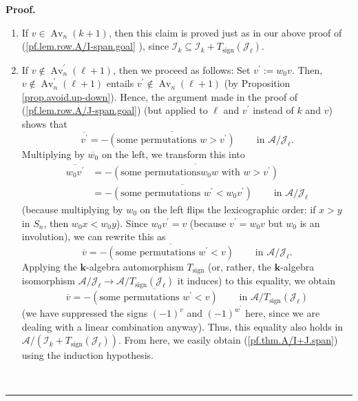 \documentclass[numbers=enddot,12pt,final,onecolumn,notitlepage]{scrartcl}%
\numberwithin{exer}{subsection}
\theoremstyle{definition}
\newenvironment{proof}[1][Proof]{\noindent\textbf{#1.} }{\ \rule{0.5em}{0.5em}}
\begin{document}
\begin{proof}
\begin{enumerate}
\item If $v\in\operatorname*{Av}\nolimits_{n}\left(  k+1\right)  $, then this
claim is proved just as in our above proof of (\ref{pf.lem.row.A/I-span.goal}%
), since $\mathcal{I}_{k}\subseteq\mathcal{I}_{k}+T_{\operatorname*{sign}%
}\left(  \mathcal{J}_{\ell}\right)  $.

\item If $v\notin\operatorname*{Av}\nolimits_{n}^{\prime}\left(
\ell+1\right)  $, then we proceed as follows: Set $v^{\prime}:=w_{0}v$. Then,
$v\notin\operatorname*{Av}\nolimits_{n}^{\prime}\left(  \ell+1\right)  $
entails $v^{\prime}\notin\operatorname*{Av}\nolimits_{n}\left(  \ell+1\right)
$ (by Proposition \ref{prop.avoid.up-down}). Hence, the argument made in the
proof of (\ref{pf.lem.row.A/J-span.goal}) (but applied to $\ell$ and
$v^{\prime}$ instead of $k$ and $v$) shows that
\[
\overline{v^{\prime}}=-\overline{\left(  \text{some permutations }w>v^{\prime
}\right)  }\ \ \ \ \ \ \ \ \ \ \text{in }\mathcal{A}/\mathcal{J}_{\ell}.
\]
Multiplying by $\overline{w_{0}}$ on the left, we transform this into
\begin{align*}
\overline{w_{0}v^{\prime}}  &  =-\overline{\left(  \text{some permutations
}w_{0}w\text{ with }w>v^{\prime}\right)  }\\
&  =-\overline{\left(  \text{some permutations }w^{\prime}<w_{0}v^{\prime
}\right)  }\ \ \ \ \ \ \ \ \ \ \text{in }\mathcal{A}/\mathcal{J}_{\ell}%
\end{align*}
(because multiplying by $w_{0}$ on the left flips the lexicographic order: if
$x>y$ in $S_{n}$, then $w_{0}x<w_{0}y$). Since $w_{0}v^{\prime}=v$ (because
$v^{\prime}=w_{0}v$ but $w_{0}$ is an involution), we can rewrite this as%
\[
\overline{v}=-\overline{\left(  \text{some permutations }w^{\prime}<v\right)
}\ \ \ \ \ \ \ \ \ \ \text{in }\mathcal{A}/\mathcal{J}_{\ell}.
\]
Applying the $\mathbf{k}$-algebra automorphism $T_{\operatorname*{sign}}$ (or,
rather, the $\mathbf{k}$-algebra isomorphism $\mathcal{A}/\mathcal{J}_{\ell
}\rightarrow\mathcal{A}/T_{\operatorname*{sign}}\left(  \mathcal{J}_{\ell
}\right)  $ it induces) to this equality, we obtain%
\[
\overline{v}=-\overline{\left(  \text{some permutations }w^{\prime}<v\right)
}\ \ \ \ \ \ \ \ \ \ \text{in }\mathcal{A}/T_{\operatorname*{sign}}\left(
\mathcal{J}_{\ell}\right)
\]
(we have suppressed the signs $\left(  -1\right)  ^{v}$ and $\left(
-1\right)  ^{w^{\prime}}$ here, since we are dealing with a linear combination
anyway). Thus, this equality also holds in $\mathcal{A}/\left(  \mathcal{I}%
_{k}+T_{\operatorname*{sign}}\left(  \mathcal{J}_{\ell}\right)  \right)  $.
From here, we easily obtain (\ref{pf.thm.A/I+J.span}) using the induction hypothesis.
\end{enumerate}


\end{proof}
\end{document}
